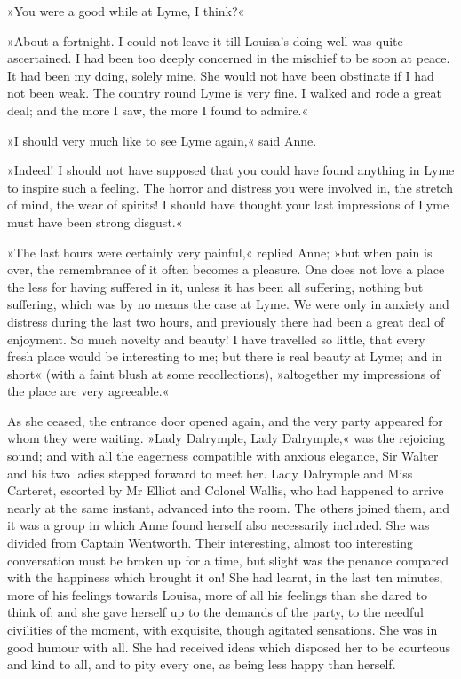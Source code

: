 »You were a good while at Lyme, I think?«

»About a fortnight. I could not leave it till Louisa's doing well was quite ascertained. I had been too deeply concerned in the mischief to be soon at peace. It had been my doing, solely mine. She would not have been obstinate if I had not been weak. The country round Lyme is very fine. I walked and rode a great deal; and the more I saw, the more I found to admire.«

»I should very much like to see Lyme again,« said Anne.

»Indeed! I should not have supposed that you could have found anything in Lyme to inspire such a feeling. The horror and distress you were involved in, the stretch of mind, the wear of spirits! I should have thought your last impressions of Lyme must have been strong disgust.«

»The last hours were certainly very painful,« replied Anne; »but when pain is over, the remembrance of it often becomes a pleasure. One does not love a place the less for having suffered in it, unless it has been all suffering, nothing but suffering, which was by no means the case at Lyme. We were only in anxiety and distress during the last two hours, and previously there had been a great deal of enjoyment. So much novelty and beauty! I have travelled so little, that every fresh place would be interesting to me; but there is real beauty at Lyme; and in short« (with a faint blush at some recollections), »altogether my impressions of the place are very agreeable.«

As she ceased, the entrance door opened again, and the very party appeared for whom they were waiting. »Lady Dalrymple, Lady Dalrymple,« was the rejoicing sound; and with all the eagerness compatible with anxious elegance, Sir Walter and his two ladies stepped forward to meet her. Lady Dalrymple and Miss Carteret, escorted by Mr Elliot and Colonel Wallis, who had happened to arrive nearly at the same instant, advanced into the room. The others joined them, and it was a group in which Anne found herself also necessarily included. She was divided from Captain Wentworth. Their interesting, almost too interesting conversation must be broken up for a time, but slight was the penance compared with the happiness which brought it on! She had learnt, in the last ten minutes, more of his feelings towards Louisa, more of all his feelings than she dared to think of; and she gave herself up to the demands of the party, to the needful civilities of the moment, with exquisite, though agitated sensations. She was in good humour with all. She had received ideas which disposed her to be courteous and kind to all, and to pity every one, as being less happy than herself.

